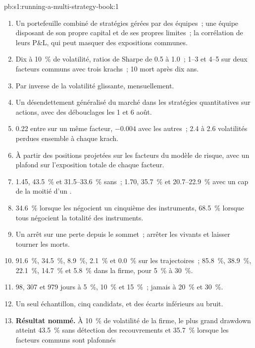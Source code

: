 \begin{solution}{pb:s1:running-a-multi-strategy-book:1}
\begin{enumerate}
\item Un portefeuille combiné de stratégies gérées par des équipes~; une équipe disposant de son propre capital et de ses propres limites~; la corrélation de leurs P\&L, qui peut masquer
des expositions communes.
\item Dix  à 10~\% de volatilité, ratios de Sharpe de 0.5 à 1.0~;  1--3 et 4--5 sur deux facteurs communs avec trois krachs~;  10 mort après dix ans.
\item Par inverse de la volatilité glissante, mensuellement.
\item Un désendettement généralisé du marché dans les stratégies quantitatives sur actions, avec des débouclages les 1 et 6 août.
\item 0.22 entre  sur un même facteur, $-0.004$ avec les autres~; 2.4 à 2.6 volatilités perdues ensemble à chaque krach.
\item À partir des positions projetées sur les facteurs du modèle de risque, avec un plafond sur l'exposition totale de chaque facteur.
\item 1.45, 43.5~\% et 31.5--33.6~\% sans~; 1.70, 35.7~\% et 20.7--22.9~\% avec un cap de la moitié d'un .
\item 34.6~\% lorsque les  négocient un cinquième des instruments, 68.5~\% lorsque tous négocient la totalité des instruments.
\item Un arrêt sur une perte depuis le sommet~; arrêter les  vivants et laisser tourner les  morts.
\item 91.6~\%, 34.5~\%, 8.9~\%, 2.1~\% et 0.0~\% sur les trajectoires~; 85.8~\%, 38.9~\%, 22.1~\%, 14.7~\% et 5.8~\% dans la firme, pour 5~\% à 30~\%.
\item 98, 307 et 979 jours à 5~\%, 10~\% et 15~\%~; jamais à 20~\% et 30~\%.
\item Un seul échantillon, cinq candidats, et des écarts inférieurs au bruit.
\item \textbf{Résultat nommé.} À 10~\% de volatilité de la firme, le plus grand drawdown atteint 43.5~\% sans détection des recouvrements et 35.7~\% lorsque les facteurs communs sont plafonnés

\end{enumerate}
\end{solution}
